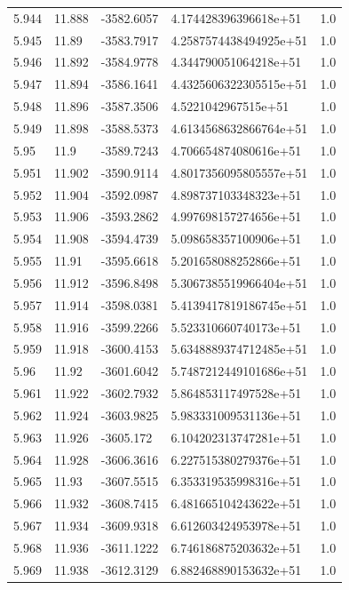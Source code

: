 \begin{tabular}{lllll}
5.944 & 11.888 & -3582.6057 & 4.174428396396618e+51 & 1.0 \\
5.945 & 11.89 & -3583.7917 & 4.2587574438494925e+51 & 1.0 \\
5.946 & 11.892 & -3584.9778 & 4.344790051064218e+51 & 1.0 \\
5.947 & 11.894 & -3586.1641 & 4.4325606322305515e+51 & 1.0 \\
5.948 & 11.896 & -3587.3506 & 4.5221042967515e+51 & 1.0 \\
5.949 & 11.898 & -3588.5373 & 4.6134568632866764e+51 & 1.0 \\
5.95 & 11.9 & -3589.7243 & 4.706654874080616e+51 & 1.0 \\
5.951 & 11.902 & -3590.9114 & 4.8017356095805557e+51 & 1.0 \\
5.952 & 11.904 & -3592.0987 & 4.898737103348323e+51 & 1.0 \\
5.953 & 11.906 & -3593.2862 & 4.997698157274656e+51 & 1.0 \\
5.954 & 11.908 & -3594.4739 & 5.098658357100906e+51 & 1.0 \\
5.955 & 11.91 & -3595.6618 & 5.201658088252866e+51 & 1.0 \\
5.956 & 11.912 & -3596.8498 & 5.3067385519966404e+51 & 1.0 \\
5.957 & 11.914 & -3598.0381 & 5.4139417819186745e+51 & 1.0 \\
5.958 & 11.916 & -3599.2266 & 5.523310660740173e+51 & 1.0 \\
5.959 & 11.918 & -3600.4153 & 5.6348889374712485e+51 & 1.0 \\
5.96 & 11.92 & -3601.6042 & 5.7487212449101686e+51 & 1.0 \\
5.961 & 11.922 & -3602.7932 & 5.864853117497528e+51 & 1.0 \\
5.962 & 11.924 & -3603.9825 & 5.983331009531136e+51 & 1.0 \\
5.963 & 11.926 & -3605.172 & 6.104202313747281e+51 & 1.0 \\
5.964 & 11.928 & -3606.3616 & 6.227515380279376e+51 & 1.0 \\
5.965 & 11.93 & -3607.5515 & 6.353319535998316e+51 & 1.0 \\
5.966 & 11.932 & -3608.7415 & 6.481665104243622e+51 & 1.0 \\
5.967 & 11.934 & -3609.9318 & 6.612603424953978e+51 & 1.0 \\
5.968 & 11.936 & -3611.1222 & 6.746186875203632e+51 & 1.0 \\
5.969 & 11.938 & -3612.3129 & 6.882468890153632e+51 & 1.0 \\

\end{tabular}
